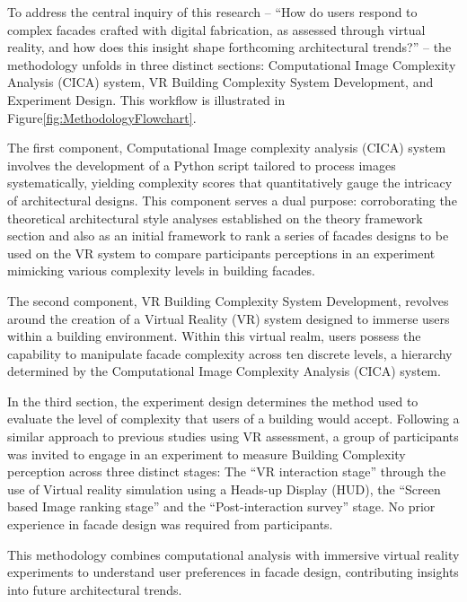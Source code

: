 
To address the central inquiry of this research – ``How do users respond to complex facades crafted with digital fabrication, as assessed through virtual reality, and how does this insight shape forthcoming architectural trends?'' – the methodology unfolds in three distinct sections: Computational Image Complexity Analysis (CICA) system, VR Building Complexity System Development, and Experiment Design.
This workflow is illustrated in Figure\ref{fig:MethodologyFlowchart}.


The first component, Computational Image complexity analysis (CICA) system involves the development of a Python script tailored to process images systematically, yielding complexity scores that quantitatively gauge the intricacy of architectural designs.
This component serves a dual purpose: corroborating the theoretical architectural style analyses established on the theory framework section and also as an initial framework to rank a series of facades designs to be used on the VR system to compare participants perceptions in an experiment mimicking various complexity levels in building facades.

The second component, VR Building Complexity System Development, revolves around the creation of a Virtual Reality (VR) system designed to immerse users within a building environment.
Within this virtual realm, users possess the capability to manipulate facade complexity across ten discrete levels, a hierarchy determined by the Computational Image Complexity Analysis (CICA) system.

In the third section, the experiment design determines the method used to evaluate the level of complexity that users of a building would accept.
Following a similar approach to previous studies using VR assessment\cite{Wolfartsberger2019}, a group of participants was invited to engage in an experiment to measure Building Complexity perception across three distinct stages: The ``VR interaction stage'' through the use of Virtual reality simulation using a Heads-up Display (HUD), the ``Screen based Image ranking stage'' and the ``Post-interaction survey'' stage.
No prior experience in facade design was required from participants.

This methodology combines computational analysis with immersive virtual reality experiments to understand user preferences in facade design, contributing insights into future architectural trends.


